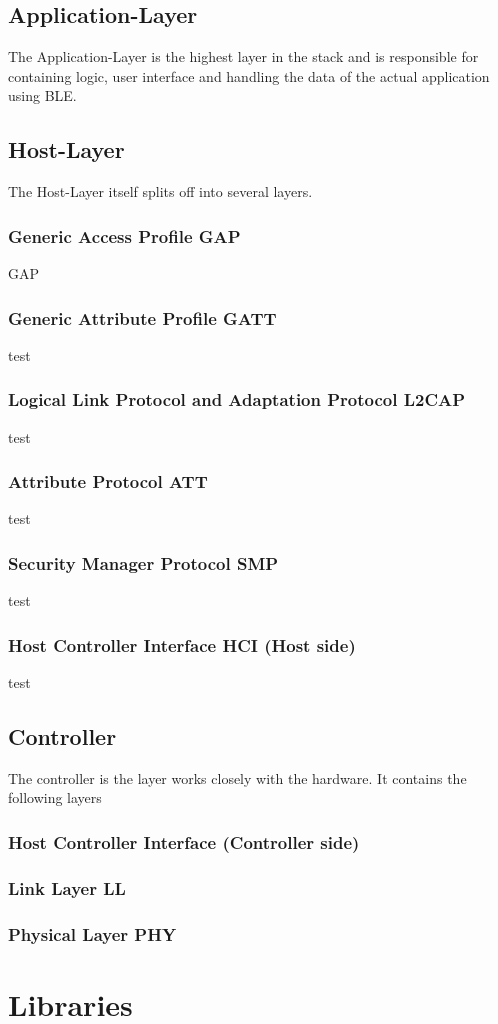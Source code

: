 \subsection{Application-Layer}
The Application-Layer is the highest layer in the stack and is responsible for containing logic, user interface and handling the data of the actual application using BLE.

\subsection{Host-Layer}
The Host-Layer itself splits off into several layers.

\subsubsection{Generic Access Profile GAP}
GAP

\subsubsection{Generic Attribute Profile GATT}
test

\subsubsection{Logical Link Protocol and Adaptation Protocol L2CAP}
test

\subsubsection{Attribute Protocol ATT}
test

\subsubsection{Security Manager Protocol SMP}
test

\subsubsection{Host Controller Interface HCI (Host side)}
test

\subsection{Controller}
The controller is the layer works closely with the hardware. It contains the following layers

\subsubsection{Host Controller Interface (Controller side)}
\subsubsection{Link Layer LL}
\subsubsection{Physical Layer PHY}

\section{Libraries}

\filbreak
